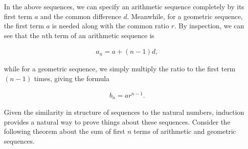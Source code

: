 In the above sequences, we can specify an arithmetic sequence completely by its first term $a$ and the common difference $d$. Meanwhile, for a geometric sequence, the first term $a$ is needed along with the common ratio $r$. By inspection, we can see that the $n$th term of an arithmetic sequence is

\begin{align*}
	a_n = a + (n - 1)d,
\end{align*}

while for a geometric sequence, we simply multiply the ratio to the first term $(n - 1)$ times, giving the formula

\begin{align*}
	b_n = a r^{n - 1}.
\end{align*}

Given the similarity in structure of sequences to the natural numbers, induction provides a natural way to prove things about these sequences. Consider the following theorem about the sum of first $n$ terms of arithmetic and geometric sequences.

